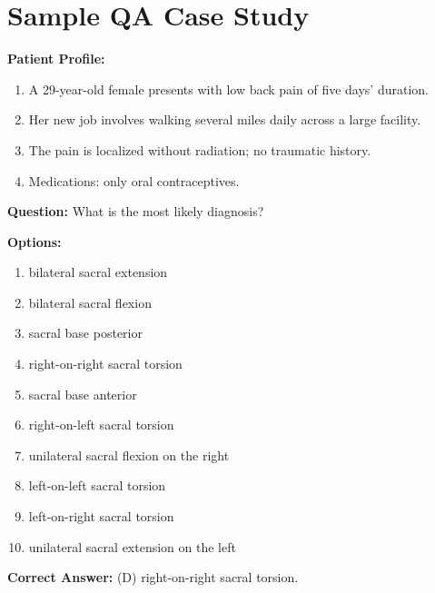 \documentclass[11pt]{article}
\begin{document}
\section{Sample QA Case Study}
\label{sample}
\begin{tcolorbox}[colback=blue!3!white, colframe=blue!50!white,
                  title=Example of QA Data (from MedXpert QA ID0071), left=10mm, breakable]
\small

\textbf{Patient Profile:}
\begin{enumerate}
  \item A 29-year-old female presents with low back pain of five days’ duration.
  \item Her new job involves walking several miles daily across a large facility.
  \item The pain is localized without radiation; no traumatic history.
  \item Medications: only oral contraceptives.
\end{enumerate}

\bigskip
\textbf{Question: }What is the most likely diagnosis?

\bigskip
\textbf{Options:}
\begin{enumerate}[label=\Alph*.]
  \item bilateral sacral extension  
  \item bilateral sacral flexion  
  \item sacral base posterior  
  \item right-on-right sacral torsion  
  \item sacral base anterior  
  \item right-on-left sacral torsion  
  \item unilateral sacral flexion on the right  
  \item left-on-left sacral torsion  
  \item left-on-right sacral torsion  
  \item unilateral sacral extension on the left  
\end{enumerate}

\bigskip
\textbf{Correct Answer:} (D) right-on-right sacral torsion.

\bigskip
\noindent
\label{tab:label_landscape_comparison}


\end{tcolorbox}
\end{document}
